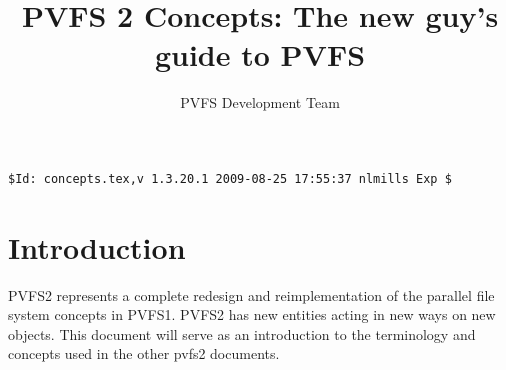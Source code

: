 \documentclass[10pt]{article} %
\title{PVFS 2 Concepts: The new guy's guide to PVFS}
\author{PVFS Development Team}
\begin{document}
\maketitle

\begin{verbatim}$Id: concepts.tex,v 1.3.20.1 2009-08-25 17:55:37 nlmills Exp $\end{verbatim}
\section{Introduction}

PVFS2 represents a complete redesign and reimplementation of the
parallel file system concepts in PVFS1.  PVFS2 has new entities acting
in new ways on new objects.  This document will serve as an introduction
to the terminology and concepts used in the other pvfs2 documents.

\end{document}
